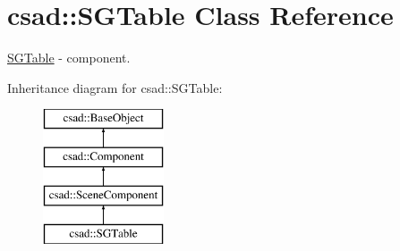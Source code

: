 \hypertarget{classcsad_1_1_s_g_table}{\section{csad\-:\-:S\-G\-Table Class Reference}
\label{classcsad_1_1_s_g_table}
}


\hyperlink{classcsad_1_1_s_g_table}{S\-G\-Table} -\/ component.  


Inheritance diagram for csad\-:\-:S\-G\-Table\-:\begin{figure}[H]
\begin{center}
\leavevmode
\includegraphics[height=4.000000cm]{classcsad_1_1_s_g_table}
\end{center}
\end{figure}
